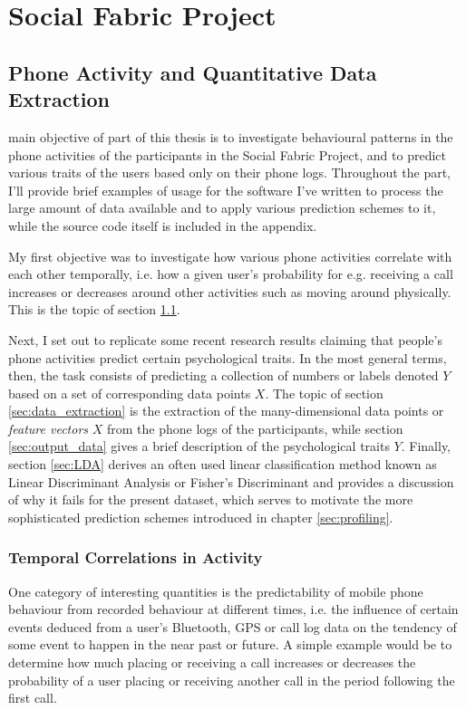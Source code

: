\part{Social Fabric Project}
\label{part:social_fabric}
\chapter[Data Extraction]{Phone Activity and Quantitative Data Extraction}
 main objective of part \ref{part:social_fabric} of this thesis is to investigate behavioural patterns in the phone activities of the participants in the Social Fabric Project, and to predict various traits of the users based only on their phone logs. Throughout the part, I'll provide brief examples of usage for the software I've written to process the large amount of data available and to apply various prediction schemes to it, while the source code itself is included in the appendix.

My first objective was to investigate how various phone activities correlate with each other temporally, i.e. how a given user's probability for e.g. receiving a call increases or decreases around other activities such as moving around physically. This is the topic of section \ref{sec:activity_triggers}.

Next, I set out to replicate some recent research results claiming that people's phone activities predict certain psychological traits. In the most general terms, then, the task consists of predicting a collection of numbers or labels denoted $Y$ based on a set of corresponding data points $X$. The topic of section \ref{sec:data_extraction} is the extraction of the many-dimensional data points or \textit{feature vectors} $X$ from the phone logs of the participants, while section \ref{sec:output_data} gives a brief description of the psychological traits $Y$. Finally, section \ref{sec:LDA} derives an often used linear classification method known as Linear Discriminant Analysis or Fisher's Discriminant and provides a discussion of why it fails for the present dataset, which serves to motivate the more sophisticated prediction schemes introduced in chapter \ref{sec:profiling}.

\section{Temporal Correlations in Activity}
\label{sec:activity_triggers}
One category of interesting quantities is the predictability of mobile phone behaviour from recorded behaviour at different times, i.e. the influence of certain events deduced from a user's Bluetooth, GPS or call log data on the tendency of some event to happen in the near past or future. A simple example would be to determine how much placing or receiving a call increases or decreases the probability of a user placing or receiving another call in the period following the first call.

